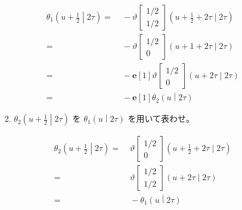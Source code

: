 \documentclass[12pt,b5paper]{ltjsarticle}
\begin{document}
\begin{enumerate}
\begin{enumerate}
\begin{enumerate}
                    \begin{align}
                     \theta_{1} \left(u+\frac{1}{2} \middle| 2\tau \right)
                     =&\;
                     -\vartheta \begin{bmatrix} 1/2 \\ 1/2 \end{bmatrix} (u+\frac{1}{2}+2\tau \mid 2\tau)\\
                     =&\;
                     -\vartheta \begin{bmatrix} 1/2 \\ 0 \end{bmatrix} (u+1+2\tau \mid 2\tau)\\
                     =&\; -\mathbf{e}[1]
                     \vartheta \begin{bmatrix} 1/2 \\ 0 \end{bmatrix} (u+2\tau \mid 2\tau)\\
                     =&\; -\mathbf{e}[1] \theta_{2} \left(u \middle| 2\tau \right)
                    \end{align}

                    \hrulefill

              \item $\displaystyle \theta_{2} \left(u+\frac{1}{2} \middle| 2\tau \right)$
                    を
                    $\displaystyle \theta_{1} \left(u \middle| 2\tau \right)$
                    を用いて表わせ。

                    \dotfill

                    \begin{align}
                     \theta_{2} \left(u+\frac{1}{2} \middle| 2\tau \right)
                     =&\;
                     \vartheta \begin{bmatrix} 1/2 \\ 0 \end{bmatrix} (u+\frac{1}{2}+2\tau \mid 2\tau)\\
                     =&\;
                     \vartheta \begin{bmatrix} 1/2 \\ 1/2 \end{bmatrix} (u+2\tau \mid 2\tau)\\
                     =&\;
                     -\theta_{1} \left(u \middle| 2\tau \right)
                    \end{align}

                    \hrulefill


\end{enumerate}
\end{enumerate}
\end{enumerate}
\end{document}
